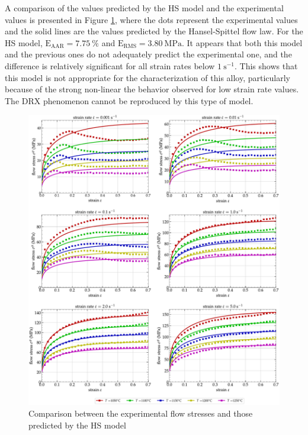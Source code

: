 \documentclass[twoside,english,1p,final,sort&compress]{elsarticle}
\theoremstyle{plain}
\DeclareRobustCommand{\RMSE}{\text{E}_\text{RMS}}
\DeclareRobustCommand{\AARE}{\text{E}_\text{AAR}}
\DeclareRobustCommand{\ps}{\text{s}^{-1}}
\DeclareRobustCommand{\MPa}{\text{MPa}}
\begin{document}
A comparison of the values predicted by the HS model and the experimental values is presented in Figure \ref{fig:CompExp-HS-6}, where the dots represent the experimental values and the solid lines are the values predicted by the Hansel-Spittel flow law.
For the HS model, $\AARE=7.75~\%$ and $\RMSE=3.80~\MPa$.
It appears that both this model and the previous ones do not adequately predict the experimental one, and the difference is relatively significant for all strain rates below $1~\ps$.
This shows that this model is not appropriate for the characterization of this alloy, particularly because of the strong non-linear the behavior observed for low strain rate values. The DRX phenomenon cannot be reproduced by this type of model.

\begin{figure}[!ht]
\centering
\includegraphics[width=\columnwidth]
{Figures/CompExp-HS-6}
\caption{Comparison between the experimental flow stresses and those predicted by the HS model}
\label{fig:CompExp-HS-6}
\end{figure}

\end{document}
